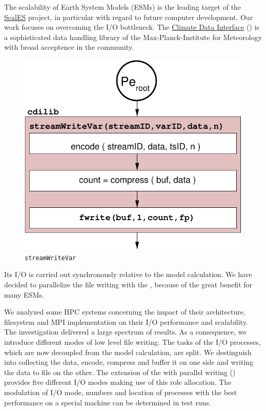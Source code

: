 The scalability of Earth System Models (ESMs) is the leading target of the 
\href{http://www.dkrz.de/Klimaforschung/dkrz-und-klimaforschung/infraproj/scales
}{ScalES}
project, in particular with regard to future computer development. Our work  
focuses on overcoming the I/O bottleneck.  The 
\href{https://code.mpimet.mpg.de/projects/cdi}{Climate Data Interface} ({\CDI}) is a 
sophisticated data handling library of 
the Max-Planck-Institute for Meteorology with broad acceptence in the 
community. 
\begin{figure}
\vspace{-10pt}
\centering
\includegraphics[scale=0.5]{../graphics/serial.pdf}
\vspace{-10pt}
\caption{{{\CDI} {\tt streamWriteVar}}}
\vspace{-10pt}
\end{figure}
Its I/O is carried out synchronously relative to the model calculation. 
We have decided to parallelize the file writing with the {\CDI}, because of the 
great benefit for many ESMs.
\smallskip 
 
We analyzed 
some HPC systems concerning the impact of their architecture, filesystem and 
MPI implementation on their I/O performance and scalability. The investigation 
delivered a large spectrum of results. As a consequence, 
we introduce different modes of low level file writing. The tasks 
of the I/O processes, which are now decoupled from the model calculation, are split.
We destinguish into collecting the data, encode, compress 
and buffer it on one side and writing the data to file on the other. The extension 
of the {\CDI} with parallel writing ({\pio}) provides five different I/O modes 
making use of this role allocation. The modulation of I/O mode, numbers and 
location of processes with the best performance on a 
special machine can be determined in test runs. 
\smallskip  

